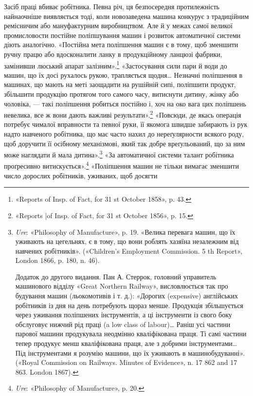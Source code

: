 Засіб праці вбиває робітника. Певна річ, ця безпосередня
протилежність найнаочніше виявляється тоді, коли новозаведена
машина конкурує з традиційним ремісничим або мануфактурним
виробництвом. Але й у межах самої великої промисловости постійне
поліпшування машин і розвиток автоматичної системи діють аналогічно.
«Постійна мета поліпшення машин є в тому, щоб зменшити
ручну працю або вдосконалити ланку в продукційному
ланцюзі фабрики, замінивши люський апарат залізним».\footnote{
«Reports of Insp. of Fact, for 31 st October 1858», p. 43.
}
«Застосування сили пари й води до машин, що їх досі рухалось
рукою, трапляється щодня\dots{} Незначні поліпшення в машинах,
що мають на меті заощадити на рушійній сипі, поліпшити продукт,
збільшити продукцію протягом того самого часу, витиснути дитину,
жінку або чоловіка, — такі поліпшення робиться постійно
і, хоч на око вага цих поліпшень невелика, все ж вони дають
важливі результати».\footnote{
«Reports |of Insp. of Fact, for 31 st October 1856», p. 15.
} «Повсюди, де якась операція потребує
чималої вправности та певної руки, її якомога швидше забирають
із рук надто навченого робітника, що має часто нахил до нереґулярности
всякого роду, щоб доручити її осібному механізмові,
який так добре вреґульований, що за ним може наглядати й
мала дитина».\footnote{
\emph{Ure}: «Philosophy of Manufacture», p. 19. «Велика перевага
машин, що їх уживають на цегельнях, є в тому, що вони роблять хазяїна
незалежним від навчених робітників». («Children’s Employment Commission.
5 th Report», London 1866, p. 180, n. 46).

Додаток до другого видання. Пан А. Стеррок, головний управитель
машинового відділу «Great Northern Railway», висловлюється так про
будування машин (льокомотивів і т. д.): «Дорогих (expensive) англійських
робітників із дня на день потребують щораз менше. Продукція збільшується
через уживання поліпшених інструментів, а ці інструменти із свого
боку обслуговує нижчий рід праці (a low class of labour)\dots{} Раніш усі частини
парової машини продукувала неодмінно кваліфікована праця.
Ті самі частини тепер продукує менш кваліфікована праця, але з добрими
інструментами\dots{} Під інструментами я розумію машини, що їх уживають
в машинобудуванні». («Royal Commission on Railways. Minutes of Evidence»,
n. 17 862 and 17 863. London 1867).
} «За автоматичної системи талант робітника проґресивно
витискується».\footnote{
\emph{Ure}: «Philosophy of Manufacture», p. 20.
} «Поліпшення машин не тільки вимагає
зменшити число дорослих робітників, уживаних, щоб досягти
